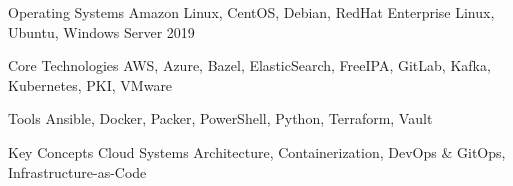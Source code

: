 \begin{cvskills}


\cvskill
{Operating Systems} %
{ %
 Amazon Linux,
 CentOS,
 Debian,
 RedHat Enterprise Linux,
 Ubuntu,
 Windows Server 2019
}


\cvskill
{Core Technologies} %
{ %
 AWS,
 Azure,
 Bazel,
 ElasticSearch,
 FreeIPA,
 GitLab,
 Kafka,
 Kubernetes,
 PKI,
 VMware
}


\cvskill
{Tools} %
{ %
 Ansible,
 Docker,
 Packer,
 PowerShell,
 Python,
 Terraform,
 Vault
}


\cvskill
{Key Concepts} %
{ %
 Cloud Systems Architecture,
 Containerization,
 DevOps \& GitOps,
 Infrastructure-as-Code
}


\end{cvskills}
